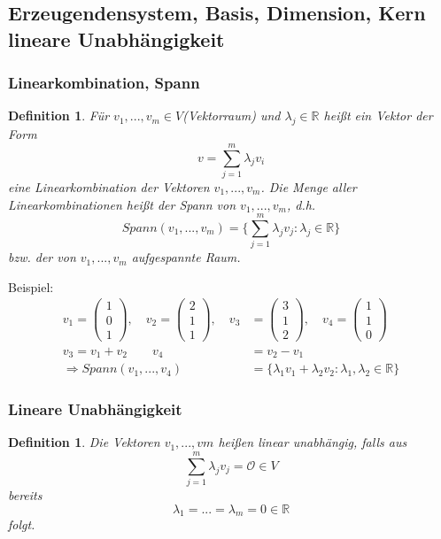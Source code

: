 \documentclass[12pt,a4paper]{article}%
\newtheorem{definition}[satz]{Definition}
\numberwithin{equation}{section}
\newcommand{\R}{\mathbb{R}} %
\def\vecT#1{\left(\begin{array}{c} #1 \end{array}\right)}
\def\vecN{\mathcal{O}}
\def\inRs{\in \R}
\def\brac#1{\left( #1 \right)}
\numberwithin{equation}{subsection}
\begin{document}
	  \subsection{Erzeugendensystem, Basis, Dimension, Kern lineare Unabhängigkeit}
	  \subsubsection{Linearkombination, Spann}
	  \begin{definition}
	    Für $v_1,...,v_m \in V$(Vektorraum) und $\lambda_j \inRs $ heißt ein Vektor der Form 
	    \begin{equation}
	      v = \sum_{j = 1}^m \lambda_j v_i
	    \end{equation}
	    eine Linearkombination der Vektoren $v_1,...,v_m$. Die Menge aller Linearkombinationen heißt der Spann von $v_1,...,v_m$, d.h.
	    \begin{equation}
	      Spann(v_1,...,v_m) = \lbrace \sum_{j=1}^m \lambda_j v_j: \lambda_j \inRs \rbrace
      \end{equation}	     
      bzw. der von $v_1,...,v_m$ aufgespannte Raum. \cite{HM12}
	  \end{definition}
	  
	  Beispiel:
	  \begin{align*}
	    v_1 = \vecT{1\\0\\1}, \quad v_2 = \vecT{2\\1\\1}, \quad v_3 &= \vecT{3\\1\\2}, \quad v_4 = \vecT{1\\1\\0}\\
	    v_3 = v_1 + v_2 \quad \quad v_4 &= v_2-v_1\\
	    \Rightarrow Spann\brac{v_1,...,v_4} &= \lbrace \lambda_1 v_1 + \lambda_2 v_2: \lambda_1, \lambda_2 \inRs \rbrace
	  \end{align*}
	  
	  \subsubsection{Lineare Unabhängigkeit}
	  \begin{definition}
	    Die Vektoren $v_1,...,vm$ heißen linear unabhängig, falls aus 
	    \begin{equation}
	      \sum_{j=1}^m \lambda_j v_j = \vecN \in V
	    \end{equation}
	    bereits 
	    \begin{equation}
	      \lambda_1 = ... = \lambda_m = 0 \inRs 
	    \end{equation}
	    folgt.
	  \end{definition}
	  
\end{document}

